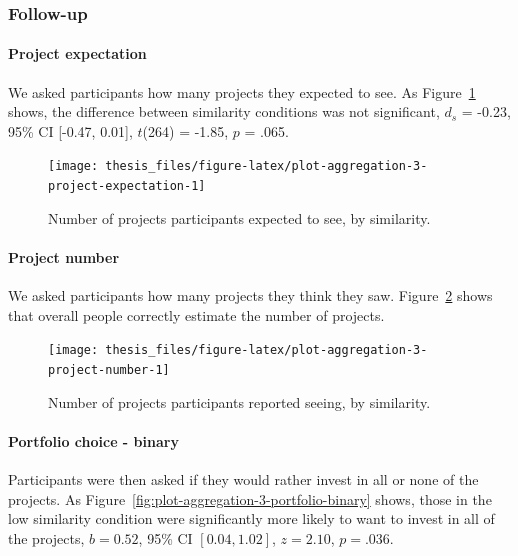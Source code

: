 \documentclass[a4paper, nobind, dvipsnames]{templates/ociamthesis}
\theoremstyle{definition}
\theoremstyle{definition}
\theoremstyle{definition}
\theoremstyle{definition}
\theoremstyle{remark}
\begin{document}
\subsubsection{Follow-up}

\paragraph{Project expectation}

We asked participants how many projects they expected to see. As
Figure~\ref{fig:plot-aggregation-3-project-expectation} shows, the difference
between similarity conditions was not significant,
\(d_s\) = -0.23, 95\% CI {[}-0.47, 0.01{]}, \(t\)(264) = -1.85, \(p\) = .065.



\begin{figure}
\texttt{[image: thesis\_files/figure-latex/plot-aggregation-3-project-expectation-1]} \caption{Number of projects participants expected to see, by similarity.}\label{fig:plot-aggregation-3-project-expectation}
\end{figure}

\paragraph{Project number}

We asked participants how many projects they think they saw.
Figure~\ref{fig:plot-aggregation-3-project-number} shows that overall people
correctly estimate the number of projects.



\begin{figure}
\texttt{[image: thesis\_files/figure-latex/plot-aggregation-3-project-number-1]} \caption{Number of projects participants reported seeing, by similarity.}\label{fig:plot-aggregation-3-project-number}
\end{figure}

\paragraph{Portfolio choice - binary}

Participants were then asked if they would rather invest in all or none of the
projects. As Figure~\ref{fig:plot-aggregation-3-portfolio-binary} shows, those
in the low similarity condition were significantly more likely to want to invest
in all of the projects,
\(b = 0.52\), 95\% CI \([0.04, 1.02]\), \(z = 2.10\), \(p = .036\).
\end{document}
